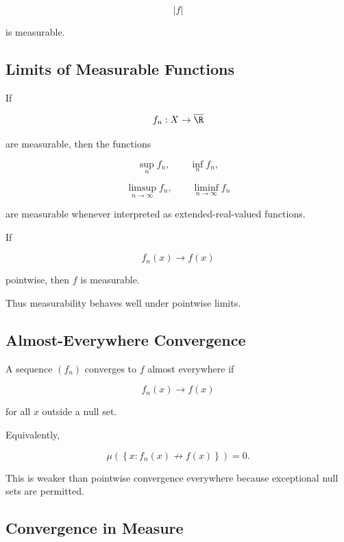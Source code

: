 \[
\boxed{
|f|
}
\]

is measurable.

\subsection{Limits of Measurable Functions}
\label{subsec:limits-measurable-functions}

If

\[
f_n:X\to\overline{\R}
\]

are measurable, then the functions

\[
\boxed{
\sup_n f_n,
\qquad
\inf_n f_n,
}
\]

\[
\boxed{
\limsup_{n\to\infty}f_n,
\qquad
\liminf_{n\to\infty}f_n
}
\]

are measurable whenever interpreted as extended-real-valued functions.

If

\[
f_n(x)\to f(x)
\]

pointwise, then \(f\) is measurable.

Thus measurability behaves well under pointwise limits.

\subsection{Almost-Everywhere Convergence}
\label{subsec:almost-everywhere-convergence}

A sequence \((f_n)\) converges to \(f\) almost everywhere if

\[
\boxed{
f_n(x)\to f(x)
}
\]

for all \(x\) outside a null set.

Equivalently,

\[
\boxed{
\mu\left(
\left\{
x:
f_n(x)\not\to f(x)
\right\}
\right)
=
0.
}
\]

This is weaker than pointwise convergence everywhere because exceptional
null sets are permitted.

\subsection{Convergence in Measure}
\label{subsec:convergence-in-measure}

